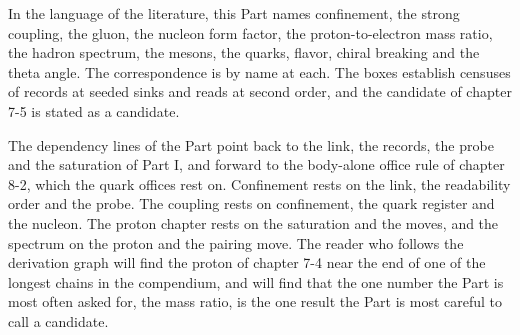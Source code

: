 In the language of the literature, this Part names confinement, the strong coupling, the gluon, the nucleon form factor, the proton-to-electron mass ratio, the hadron spectrum, the mesons, the quarks, flavor, chiral breaking and the theta angle. The correspondence is by name at each. The boxes establish censuses of records at seeded sinks and reads at second order, and the candidate of chapter 7-5 is stated as a candidate.

The dependency lines of the Part point back to the link, the records, the probe and the saturation of Part I, and forward to the body-alone office rule of chapter 8-2, which the quark offices rest on. Confinement rests on the link, the readability order and the probe. The coupling rests on confinement, the quark register and the nucleon. The proton chapter rests on the saturation and the moves, and the spectrum on the proton and the pairing move. The reader who follows the derivation graph will find the proton of chapter 7-4 near the end of one of the longest chains in the compendium, and will find that the one number the Part is most often asked for, the mass ratio, is the one result the Part is most careful to call a candidate.
